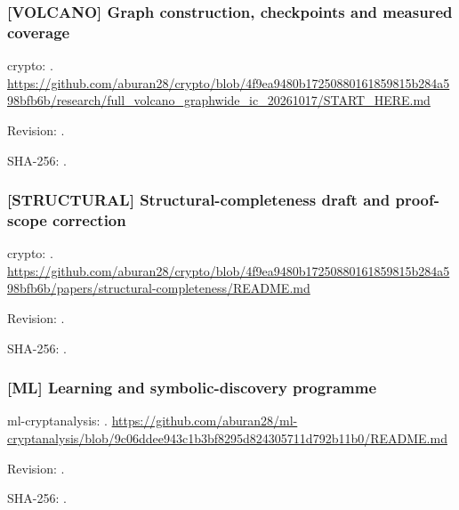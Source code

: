 \par\noindent\begin{minipage}{\linewidth}\small
\subsubsection*{[VOLCANO] Graph construction, checkpoints and measured coverage}\label{art:VOLCANO}
crypto: .
\url{https://github.com/aburan28/crypto/blob/4f9ea9480b17250880161859815b284a598bfb6b/research/full_volcano_graphwide_ic_20261017/START_HERE.md}
\par Revision: .
\par SHA-256: .
\end{minipage}\par\medskip

\par\noindent\begin{minipage}{\linewidth}\small
\subsubsection*{[STRUCTURAL] Structural-completeness draft and proof-scope correction}\label{art:STRUCTURAL}
crypto: .
\url{https://github.com/aburan28/crypto/blob/4f9ea9480b17250880161859815b284a598bfb6b/papers/structural-completeness/README.md}
\par Revision: .
\par SHA-256: .
\end{minipage}\par\medskip

\par\noindent\begin{minipage}{\linewidth}\small
\subsubsection*{[ML] Learning and symbolic-discovery programme}\label{art:ML}
ml-cryptanalysis: .
\url{https://github.com/aburan28/ml-cryptanalysis/blob/9c06ddee943c1b3bf8295d824305711d792b11b0/README.md}
\par Revision: .
\par SHA-256: .
\end{minipage}\par\medskip


